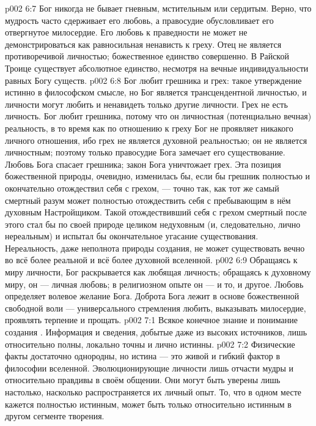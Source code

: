 \vs p002 6:7 \pc Бог никогда не бывает гневным, мстительным или сердитым. Верно, что мудрость часто сдерживает его любовь, а правосудие обусловливает его отвергнутое милосердие. Его любовь к праведности не может не демонстрироваться как равносильная ненависть к греху. Отец не является противоречивой личностью; божественное единство совершенно. В Райской Троице существует абсолютное единство, несмотря на вечные индивидуальности равных Богу существ.
\vs p002 6:8 \pc Бог любит грешника и  грех: такое утверждение истинно в философском смысле, но Бог является трансцендентной личностью, и личности могут любить и ненавидеть только другие личности. Грех не есть личность. Бог любит грешника, потому что он личностная (потенциально вечная) реальность, в то время как по отношению к греху Бог не проявляет никакого личного отношения, ибо грех не является духовной реальностью; он не является личностным; поэтому только правосудие Бога замечает его существование. Любовь Бога спасает грешника; закон Бога уничтожает грех. Эта позиция божественной природы, очевидно, изменилась бы, если бы грешник полностью и окончательно отождествил себя с грехом, --- точно так, как тот же самый смертный разум может полностью отождествить себя с пребывающим в нём духовным Настройщиком. Такой отождествивший себя с грехом смертный после этого стал бы по своей природе целиком недуховным (и, следовательно, лично нереальным) и испытал бы окончательное угасание существования. Нереальность, даже неполнота природы создания, не может существовать вечно во всё более реальной и всё более духовной вселенной.
\vs p002 6:9 \pc Обращаясь к миру личности, Бог раскрывается как любящая личность; обращаясь к духовному миру, он --- личная любовь; в религиозном опыте он --- и то, и другое. Любовь определяет волевое желание Бога. Доброта Бога лежит в основе божественной свободной воли --- универсального стремления любить, выказывать милосердие, проявлять терпение и прощать.
\vs p002 7:1 Всякое конечное знание и понимание создания . Информация и сведения, добытые даже из высоких источников, лишь относительно полны, локально точны и лично истинны.
\vs p002 7:2 Физические факты достаточно однородны, но истина --- это живой и гибкий фактор в философии вселенной. Эволюционирующие личности лишь отчасти мудры и относительно правдивы в своём общении. Они могут быть уверены лишь настолько, насколько распространяется их личный опыт. То, что в одном месте кажется полностью истинным, может быть только относительно истинным в другом сегменте творения.
